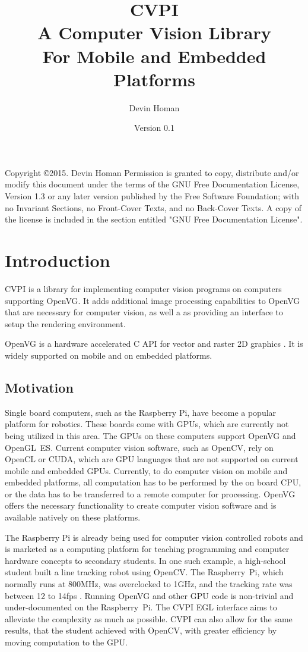 \documentclass[12pt]{report}
\author{Devin Homan}
\date{Version 0.1}
\title{CVPI\\A Computer Vision Library\\For Mobile and Embedded Platforms}
\begin{document}
\lstset{language=C}

\maketitle
\tableofcontents
\null\vfill
\noindent
Copyright \copyright 2015. Devin Homan Permission is granted to copy,
distribute and/or modify this document under the terms of the GNU Free
Documentation License, Version 1.3 or any later version published by
the Free Software Foundation; with no Invariant Sections, no
Front-Cover Texts, and no Back-Cover Texts.  A copy of the license is
included in the section entitled "GNU Free Documentation License".
\newpage
\chapter{Introduction}
\label{sec-1}
CVPI is a library for implementing computer vision programs on
computers supporting OpenVG. It adds additional image processing
capabilities to OpenVG that are necessary for computer vision, as well
a as providing an interface to setup the rendering environment.

OpenVG is a hardware accelerated C API for vector and raster 2D
graphics \cite{openvg}. It is widely supported on mobile and on
embedded platforms.
\section{Motivation}
\label{sec-1-1}
Single board computers, such as the Raspberry Pi, have become a
popular platform for robotics. These boards come with GPUs, which are
currently not being utilized in this area. The GPUs on these computers
support OpenVG and OpenGL~ES. Current computer vision software, such
as OpenCV, rely on OpenCL or CUDA, which are GPU languages that are
not supported on current mobile and embedded GPUs. Currently, to do
computer vision on mobile and embedded platforms, all computation has
to be performed by the on board CPU, or the data has to be transferred
to a remote computer for processing.  OpenVG offers the necessary
functionality to create computer vision software and is available
natively on these platforms.

The Raspberry Pi is already being used for computer vision controlled
robots and is marketed as a computing platform for teaching
programming and computer hardware concepts to secondary students. In
one such example, a high-school student built a line tracking robot
using OpenCV. The Raspberry~Pi, which normally runs at 800MHz, was
overclocked to 1GHz, and the tracking rate was between 12 to 14fps
\cite{robocup}.  Running OpenVG and other GPU code is non-trivial and
under-documented on the Raspberry~Pi. The CVPI EGL interface aims to
alleviate the complexity as much as possible. CVPI can also allow for
the same results, that the student achieved with OpenCV, with greater
efficiency by moving computation to the GPU.
\end{document}
